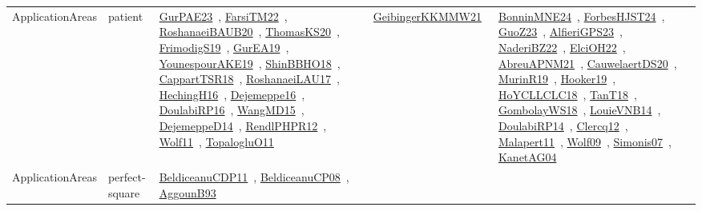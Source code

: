 {\begin{longtable}{lp{3cm}>{\raggedright\arraybackslash}p{6cm}>{\raggedright\arraybackslash}p{6cm}>{\raggedright\arraybackslash}p{8cm}}
ApplicationAreas & patient & \href{../works/GurPAE23.pdf}{GurPAE23}~\cite{GurPAE23}, \href{../works/FarsiTM22.pdf}{FarsiTM22}~\cite{FarsiTM22}, \href{../works/RoshanaeiBAUB20.pdf}{RoshanaeiBAUB20}~\cite{RoshanaeiBAUB20}, \href{../works/ThomasKS20.pdf}{ThomasKS20}~\cite{ThomasKS20}, \href{../works/FrimodigS19.pdf}{FrimodigS19}~\cite{FrimodigS19}, \href{../works/GurEA19.pdf}{GurEA19}~\cite{GurEA19}, \href{../works/YounespourAKE19.pdf}{YounespourAKE19}~\cite{YounespourAKE19}, \href{../works/ShinBBHO18.pdf}{ShinBBHO18}~\cite{ShinBBHO18}, \href{../works/CappartTSR18.pdf}{CappartTSR18}~\cite{CappartTSR18}, \href{../works/RoshanaeiLAU17.pdf}{RoshanaeiLAU17}~\cite{RoshanaeiLAU17}, \href{../works/HechingH16.pdf}{HechingH16}~\cite{HechingH16}, \href{../works/Dejemeppe16.pdf}{Dejemeppe16}~\cite{Dejemeppe16}, \href{../works/DoulabiRP16.pdf}{DoulabiRP16}~\cite{DoulabiRP16}, \href{../works/WangMD15.pdf}{WangMD15}~\cite{WangMD15}, \href{../works/DejemeppeD14.pdf}{DejemeppeD14}~\cite{DejemeppeD14}, \href{../works/RendlPHPR12.pdf}{RendlPHPR12}~\cite{RendlPHPR12}, \href{../works/Wolf11.pdf}{Wolf11}~\cite{Wolf11}, \href{../works/TopalogluO11.pdf}{TopalogluO11}~\cite{TopalogluO11} & \href{../works/GeibingerKKMMW21.pdf}{GeibingerKKMMW21}~\cite{GeibingerKKMMW21} & \href{../works/BonninMNE24.pdf}{BonninMNE24}~\cite{BonninMNE24}, \href{../works/ForbesHJST24.pdf}{ForbesHJST24}~\cite{ForbesHJST24}, \href{../works/GuoZ23.pdf}{GuoZ23}~\cite{GuoZ23}, \href{../works/AlfieriGPS23.pdf}{AlfieriGPS23}~\cite{AlfieriGPS23}, \href{../works/NaderiBZ22.pdf}{NaderiBZ22}~\cite{NaderiBZ22}, \href{../works/ElciOH22.pdf}{ElciOH22}~\cite{ElciOH22}, \href{../works/AbreuAPNM21.pdf}{AbreuAPNM21}~\cite{AbreuAPNM21}, \href{../works/CauwelaertDS20.pdf}{CauwelaertDS20}~\cite{CauwelaertDS20}, \href{../works/MurinR19.pdf}{MurinR19}~\cite{MurinR19}, \href{../works/Hooker19.pdf}{Hooker19}~\cite{Hooker19}, \href{../works/HoYCLLCLC18.pdf}{HoYCLLCLC18}~\cite{HoYCLLCLC18}, \href{../works/TanT18.pdf}{TanT18}~\cite{TanT18}, \href{../works/GombolayWS18.pdf}{GombolayWS18}~\cite{GombolayWS18}, \href{../works/LouieVNB14.pdf}{LouieVNB14}~\cite{LouieVNB14}, \href{../works/DoulabiRP14.pdf}{DoulabiRP14}~\cite{DoulabiRP14}, \href{../works/Clercq12.pdf}{Clercq12}~\cite{Clercq12}, \href{../works/Malapert11.pdf}{Malapert11}~\cite{Malapert11}, \href{../works/Wolf09.pdf}{Wolf09}~\cite{Wolf09}, \href{../works/Simonis07.pdf}{Simonis07}~\cite{Simonis07}, \href{../works/KanetAG04.pdf}{KanetAG04}~\cite{KanetAG04}\\
ApplicationAreas & perfect-square & \href{../works/BeldiceanuCDP11.pdf}{BeldiceanuCDP11}~\cite{BeldiceanuCDP11}, \href{../works/BeldiceanuCP08.pdf}{BeldiceanuCP08}~\cite{BeldiceanuCP08}, \href{../works/AggounB93.pdf}{AggounB93}~\cite{AggounB93} &  & \\

\end{longtable}}
